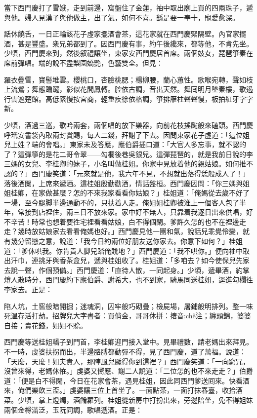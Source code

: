 當下西門慶打了雪娥，走到前邊，窩盤住了金蓮，袖中取出廟上買的四兩珠子，遞與他。婦人見漢子與他做主，出了氣，如何不喜。繇是要一奉十，寵愛愈深。

話休饒舌，一日正輪該花子虛家擺酒會茶，這花家就在西門慶緊隔壁。內官家擺酒，甚是豐盛。衆兄弟都到了。因西門慶有事，約午後纔來，都等他，不肯先坐。少頃，西門慶來到，然後叙禮讓坐，東家安西門慶居首席。兩個妓女，琵琶箏秦在席前彈唱。端的說不盡梨園嬌艷，色藝雙全。但見：

\begin{myquote}
羅衣疊雪，寶髻堆雲。櫻桃口，杏臉桃腮；楊柳腰，蘭心蕙性。歌喉宛轉，聲如枝上流鶯；舞態蹁躚，影似花間鳳轉。腔依古調，音出天然。舞囘明月墜秦樓，歌遏行雲遮楚館。高低緊慢按宮商，輕重疾徐依格調，箏排雁柱聲聲慢，板拍紅牙字字新。
\end{myquote}

少頃，酒過三巡，歌吟兩套，兩個唱的放下樂器，向前花枝搖颭般來磕頭。西門慶呼玳安書袋內取兩封賞賜，每人二錢，拜謝了下去。因問東家花子虛道：「這位姐兒上姓？端的會唱。」東家未及答應，應伯爵插口道：「大官人多忘事，就不認的了？這彈箏的是花二哥令翠——勾欄後巷吳銀兒。這彈琵琶的，就是我前日說的李三媽的女兒、李桂卿的妹子，小名叫做桂姐。你家中見放着他的親姑娘。如何推不認的？」西門慶笑道：「元來就是他，我六年不見，不想就出落得恁般成人了！」落後酒闌，上席來遞酒。這桂姐殷勤勸酒，情話盤桓。西門慶因問：「你三媽與姐姐桂卿，在家做甚麼？怎的不來我家看看你姑娘？」桂姐道：「俺媽從去歲不好了一場，至今腿脚半邊通動不的，只扶着人走。俺姐姐桂卿被淮上一個客人包了半年，常接到店裡住，兩三日不放來家。家中好不無人，只靠着我逐日出來供唱，好不辛苦！時常也想着要徃宅裡看看姑娘，白不得個閑。爹許久怎的也不在裡邊走走？幾時放姑娘家去看看俺媽也好。」西門慶見他一團和氣，說話兒乖覺伶變，就有幾分留戀之意，說道：「我今日約兩位好朋友送你家去。你意下如何？」桂姐道：「爹休哄我。你肯貴人脚兒踏俺賤地？」{}西門慶道：「我不哄你。」便向袖中取出汗巾，連挑牙與香茶盒兒，遞與桂姐收了。桂姐道：「多咱去？如今使保兒先家去說一聲，作個預備。」西門慶道：「直待人散，一同起身。」少頃，遞畢酒，約掌燈人散時分，西門慶約下應伯爵、謝希大，也不到家，騎馬同送桂姐，逕進勾欄徃李家去。正是：

\begin{myquote}
陷人坑，土窖般暗開掘；迷魂洞，囚牢般巧砌疊；檢屍場，屠鋪般明排列。整一味死溫存活打劫。招牌兒大字書者：買俏金，哥哥休拼：撦音:chě注；纏頭錦，婆婆自接；賣花錢，姐姐不賒。
\end{myquote}

西門慶等送桂姐轎子到門首，李桂卿迎門接入堂中。見畢禮數，請老媽出來拜見。不一時，虔婆扶拐而出，半邊胳膊都動彈不得，見了西門慶，道了萬福。說道：「天麼，天麼！姐夫貴人，那陣風兒颳得你到這裡？」西門慶笑道：「一向窮冗，沒曾來得，老媽休恠。」虔婆又嚮應、謝二人說道：「二位怎的也不來走走？」伯爵道：「便是白不得閑，今日在花家會茶，遇見桂姐，因此同西門爹送囘來。快看酒來，俺們樂飲三盃。」虔婆讓三位上首坐了。一面點茶，一面打抹春臺，收拾酒菜。少頃，掌上燈燭，酒餚羅列。桂姐從新房中打扮出來，{}旁邊陪坐，免不得姐妹兩個金樽滿泛，玉阮同調，歌唱遞酒。正是：

